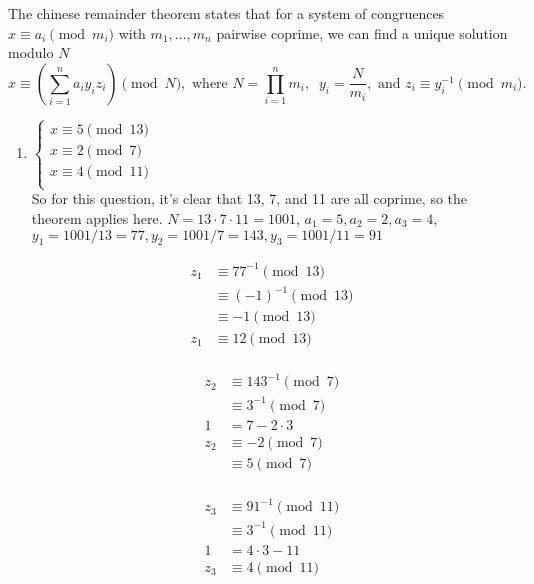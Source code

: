 \documentclass[11pt]{article}
\newcommand{\n}{\vspace{0.5cm}}
\begin{document}
\begin{enumerate}
          The chinese remainder theorem states that for a system of congruences \(x \equiv a_i \pmod{m_i}\) with \(m_1, \hdots, m_n\) pairwise coprime, we can find a unique solution modulo \(N\)
          \[x \equiv \left( \sum_{i=1}^{n} a_iy_iz_i \right) \pmod{N}, \text{ where } N = \prod_{i=1}^{n} m_i, \;\; y_i = \frac{N}{m_i}, \text{ and } z_i \equiv y_i^{-1} \pmod{m_i}.\]
      \begin{enumerate}
        \item \(\begin{cases}
            x \equiv 5 \pmod{13} \\
            x \equiv 2 \pmod{7} \\
            x \equiv 4 \pmod{11} \\
          \end{cases}\) \n\\
          So for this question, it's clear that 13, 7, and 11 are all coprime, so the theorem applies here.  \(N = 13 \cdot 7 \cdot 11 = 1001\), \(a_1 = 5, a_2 = 2, a_3 = 4\), \(y_1 = 1001/13 = 77, y_2 = 1001/7 = 143, y_3 = 1001/11 = 91\)

          \begin{minipage}{0.28\textwidth}
            \begin{align*}
              z_1      &\equiv 77^{-1} \pmod{13} \\
                       &\equiv (-1)^{-1} \pmod{13} \\
                       &\equiv -1 \pmod{13} \\
              z_1      &\equiv 12 \pmod{13} \\
            \end{align*}
          \end{minipage}
          \begin{minipage}{0.28\textwidth}
            \begin{align*}
              z_2      &\equiv 143^{-1} \pmod{7} \\
                       &\equiv 3^{-1} \pmod{7} \\
              1        &= 7 - 2 \cdot 3 \\
              z_2      &\equiv -2 \pmod{7} \\
                       &\equiv 5 \pmod{7} \\
            \end{align*}
          \end{minipage}
          \begin{minipage}{0.28\textwidth}
            \begin{align*}
              z_3      &\equiv 91^{-1} \pmod{11} \\
                       &\equiv 3^{-1} \pmod{11} \\
              1        &= 4 \cdot 3 - 11 \\
              z_3      &\equiv 4 \pmod{11} \\
            \end{align*}
          \end{minipage}


\end{enumerate}
\end{enumerate}
\end{document}
